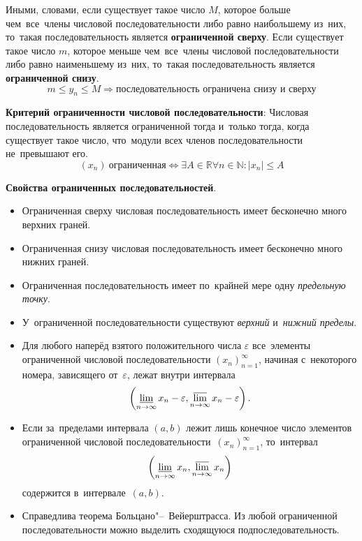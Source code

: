 \documentclass[]{scrartcl}
\begin{document}
Иными, словами, если существует такое число ${\textstyle M}$, которое больше чем~все~члены числовой последовательности либо равно наибольшему из~них, то~такая последовательность является \textbf{ограниченной сверху}. Если существует такое число ${\textstyle m}$, которое меньше чем~все~члены числовой последовательности либо равно наименьшему из~них, то~такая последовательность является \textbf{ограниченной снизу}.
\begin{equation}\label{eq:numerical-sequence-limits}
m\leq y_n \leq M \Rightarrow \text{последовательность ограничена снизу и~сверху}
\end{equation}

\textbf{Критерий ограниченности числовой последовательности}: Числовая последовательность является ограниченной тогда и~только тогда, когда существует такое число, что~модули всех членов последовательности не~превышают его.
\begin{equation}\label{eq:sequence-limit-criteria}
(x_n)\ \text{ограниченная} \Leftrightarrow \exists A \in \mathbb{R} \forall n \in \mathbb{N}:|x_n|\leq A
\end{equation} 

\textbf{Свойства ограниченных последовательностей}.
\begin{itemize}
	\item Ограниченная сверху числовая последовательность имеет бесконечно много верхних граней.
	\item Ограниченная снизу числовая последовательность имеет бесконечно много нижних граней.
	\item Ограниченная последовательность имеет по~крайней мере одну \emph{предельную точку}.
	\item У~ограниченной последовательности существуют \emph{верхний} и~\emph{нижний пределы}.
	\item Для любого наперёд взятого положительного числа ${\textstyle \varepsilon}$ все~элементы ограниченной числовой последовательности ${\textstyle \left(x_{n}\right)_{n=1}^{\infty }}$, начиная с~некоторого номера, зависящего от~${\textstyle \varepsilon}$, лежат внутри интервала
	\begin{equation}\label{eq:sequence-limit-prop1}
	\left(\varliminf_{n\to \infty} x_n - \varepsilon, \varlimsup_{n\to \infty} x_n - \varepsilon \right).
	\end{equation}
	\item Если за~пределами интервала ${\textstyle \left(a,b\right)}$ лежит лишь конечное число элементов ограниченной числовой последовательности~${\textstyle \left(x_{n}\right)_{n=1}^{\infty }}$, то~интервал
	\begin{equation}\label{eq:sequence-limit-prop2}
	\left(\varliminf_{n\to \infty} x_n, \varlimsup_{n\to \infty} x_n \right)
	\end{equation}
	содержится в~интервале~${\textstyle \left(a,b\right)}$.
	\item Справедлива теорема Больцано"--~Вейерштрасса. Из любой ограниченной последовательности можно выделить сходящуюся подпоследовательность.
\end{itemize}
\end{document}
